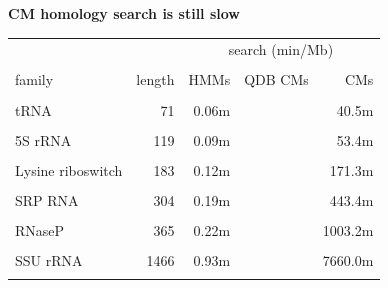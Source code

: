 \documentclass[landscape]{slides}
\begin{document}
\begin{slide}
\begin{center}
\textbf{CM homology search is still slow}
\end{center}

\small
\begin{center}
\small
\begin{tabular}{lr|rrr}
                  &        & \multicolumn{3}{c|}{search (min/Mb)} \\
                  &        &        &        &         \\
family            & length & HMMs   & QDB CMs&    CMs  \\
                  &        &        &        &         \\
tRNA              & 71     &  0.06m &        &   40.5m \\
                  &        &        &        &         \\
5S rRNA           & 119    &  0.09m &        &   53.4m \\
                  &        &        &        &         \\
Lysine riboswitch & 183    &  0.12m &        & 171.3m \\
                  &        &        &        &         \\
SRP RNA           & 304    &  0.19m &        & 443.4m \\
                  &        &        &        &         \\
RNaseP            & 365    &  0.22m &        &1003.2m  \\
                  &        &        &        &         \\
SSU rRNA          & 1466   &  0.93m &        &7660.0m  \\
                  &        &        &        &         \\
\end{tabular}
\end{center}

\vfill

\end{slide}
\end{document}
